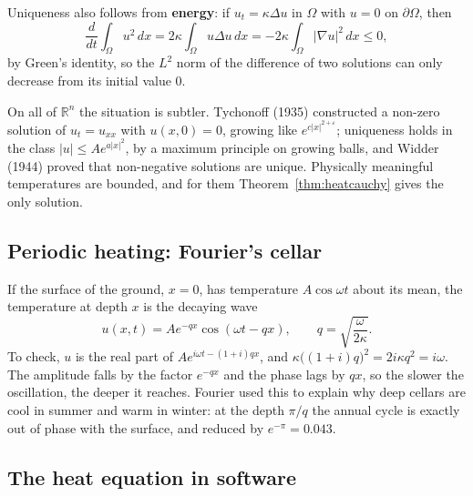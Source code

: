 \documentclass[11pt,a4paper]{article}
\numberwithin{equation}{section}
\theoremstyle{definition}
\begin{document}
Uniqueness also follows from \textbf{energy}: if $u_t = \kappa\Delta u$ in $\Omega$ with $u = 0$ on $\partial\Omega$, then
\[
\frac{d}{dt}\int_\Omega u^2\,dx = 2\kappa\int_\Omega u\Delta u\,dx = -2\kappa\int_\Omega|\nabla u|^2\,dx \leq 0 ,
\]
by Green's identity, so the $L^2$ norm of the difference of two solutions can only decrease from its initial value $0$.

On all of $\mathbb R^n$ the situation is subtler. Tychonoff (1935) constructed a non-zero solution of $u_t = u_{xx}$ with $u(x, 0) = 0$, growing like $e^{c|x|^{2 + \varepsilon}}$; uniqueness holds in the class $|u| \leq Ae^{a|x|^2}$, by a maximum principle on growing balls, and Widder (1944) proved that non-negative solutions are
unique. Physically meaningful temperatures are bounded, and for them Theorem~\ref{thm:heatcauchy} gives the only solution.

\subsection{Periodic heating: Fourier's cellar}
\label{ssec:cellar}

If the surface of the ground, $x = 0$, has temperature $A\cos\omega t$ about its mean, the temperature at depth $x$ is the decaying wave
\[
u(x, t) = Ae^{-qx}\cos(\omega t - qx), \qquad q = \sqrt{\frac{\omega}{2\kappa}} .
\]
To check, $u$ is the real part of $Ae^{i\omega t - (1 + i)qx}$, and $\kappa\bigl((1 + i)q\bigr)^2 = 2i\kappa q^2 = i\omega$. The amplitude falls by the factor $e^{-qx}$ and the phase lags by $qx$, so the slower the oscillation, the deeper it reaches. Fourier used this to explain why deep cellars
are cool in summer and warm in winter: at the depth $\pi/q$ the annual cycle is exactly out of phase with the surface, and reduced by $e^{-\pi} = 0.043$.

\subsection{The heat equation in software}
\label{ssec:software6}
\end{document}
